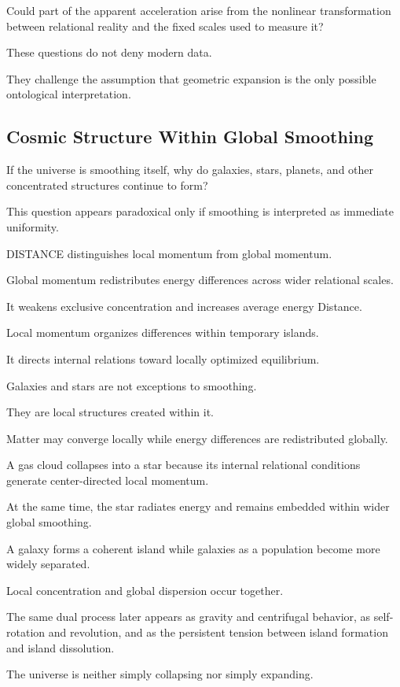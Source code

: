 Could part of the apparent acceleration arise from the nonlinear transformation between relational reality and the fixed scales used to measure it?

These questions do not deny modern data.

They challenge the assumption that geometric expansion is the only possible ontological interpretation.

\subsection*{\textbf{Cosmic Structure Within Global Smoothing}}

If the universe is smoothing itself, why do galaxies, stars, planets, and other concentrated structures continue to form?

This question appears paradoxical only if smoothing is interpreted as immediate uniformity.

DISTANCE distinguishes local momentum from global momentum.

Global momentum redistributes energy differences across wider relational scales.

It weakens exclusive concentration and increases average energy Distance.

Local momentum organizes differences within temporary islands.

It directs internal relations toward locally optimized equilibrium.

Galaxies and stars are not exceptions to smoothing.

They are local structures created within it.

Matter may converge locally while energy differences are redistributed globally.

A gas cloud collapses into a star because its internal relational conditions generate center-directed local momentum.

At the same time, the star radiates energy and remains embedded within wider global smoothing.

A galaxy forms a coherent island while galaxies as a population become more widely separated.

Local concentration and global dispersion occur together.

The same dual process later appears as gravity and centrifugal behavior, as self-rotation and revolution, and as the persistent tension between island formation and island dissolution.

The universe is neither simply collapsing nor simply expanding.

